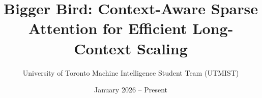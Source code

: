 \documentclass[11pt]{article}
\title{Bigger Bird: Context-Aware Sparse Attention for Efficient Long-Context Scaling}
\author{University of Toronto Machine Intelligence Student Team (UTMIST)}
\date{January 2026 -- Present}
\begin{document}
\maketitle

\begin{abstract}








\end{abstract}
\end{document}
